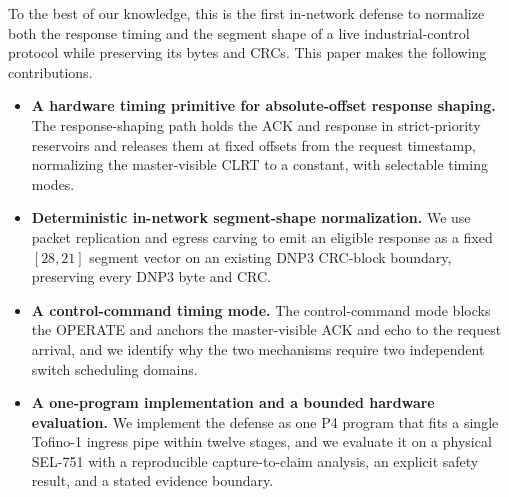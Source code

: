 To the best of our knowledge, this is the first in-network defense to normalize both the response
timing and the segment shape of a live industrial-control protocol while preserving its bytes and
CRCs. This paper makes the following contributions.
\begin{itemize}
\item \textbf{A hardware timing primitive for absolute-offset response shaping.} The response-shaping
path holds the ACK and response in strict-priority reservoirs and releases them at fixed offsets from
the request timestamp, normalizing the master-visible CLRT to a constant, with selectable timing modes.
\item \textbf{Deterministic in-network segment-shape normalization.} We use packet replication and
egress carving to emit an eligible response as a fixed $[28,21]$ segment vector on an existing DNP3
CRC-block boundary, preserving every DNP3 byte and CRC.
\item \textbf{A control-command timing mode.} The control-command mode blocks the OPERATE and anchors
the master-visible ACK and echo to the request arrival, and we identify why the two mechanisms require
two independent switch scheduling domains.
\item \textbf{A one-program implementation and a bounded hardware evaluation.} We implement the defense
as one P4 program that fits a single Tofino-1 ingress pipe within twelve stages, and we evaluate it on
a physical SEL-751 with a reproducible capture-to-claim analysis, an explicit safety result, and a
stated evidence boundary.
\end{itemize}
